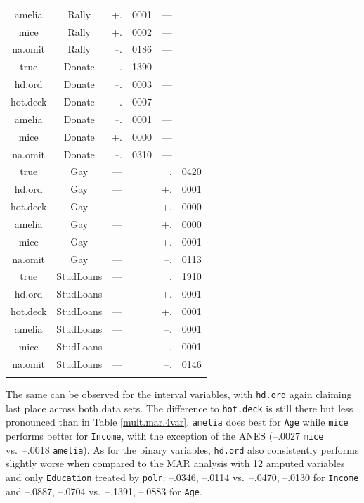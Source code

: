 \documentclass[12pt,econ]{sources/authesis}
\begin{document}
\begin{longtable}{ccr@{}lr@{}l}
 amelia & Rally & +.&0001 & --- \\ 
 mice & Rally & +.&0002 & --- \\
 na.omit & Rally & --.&0186 & --- \\ 
 true & Donate & .&1390 & --- \\ 
 hd.ord & Donate & --.&0003 & --- \\ 
 hot.deck & Donate & --.&0007 & --- \\
 amelia & Donate & --.&0001 & --- \\
 mice & Donate & +.&0000 & --- \\ 
 na.omit & Donate & --.&0310 & --- \\ 
 true & Gay & \multicolumn{2}{l}{---} & .&0420 \\ 
 hd.ord & Gay & \multicolumn{2}{l}{---} & +.&0001 \\ 
 hot.deck & Gay & \multicolumn{2}{l}{---} & +.&0000 \\ 
 amelia & Gay & \multicolumn{2}{l}{---} & +.&0000 \\ 
 mice & Gay & \multicolumn{2}{l}{---} & +.&0001 \\
 na.omit & Gay & \multicolumn{2}{l}{---} & --.&0113 \\ 
 true & StudLoans & \multicolumn{2}{l}{---} & .&1910 \\
 hd.ord & StudLoans & \multicolumn{2}{l}{---} & +.&0001 \\ 
 hot.deck & StudLoans & \multicolumn{2}{l}{---} & +.&0001 \\
 amelia & StudLoans & \multicolumn{2}{l}{---} & --.&0001 \\ 
 mice & StudLoans & \multicolumn{2}{l}{---} & --.&0001 \\ 
 na.omit & StudLoans & \multicolumn{2}{l}{---} & --.&0146 \\
 \hline \\[-1.8ex] 
 \end{longtable}
\dsp

\normalsize

The same can be observed for the interval variables, with \texttt{hd.ord} again claiming last place across both data sets. The difference to \texttt{hot.deck} is still there but less pronounced than in Table \ref{mult.mar.4var}. \texttt{amelia} does best for \texttt{Age} while \texttt{mice} performs better for \texttt{Income}, with the exception of the ANES (--.0027 \texttt{mice} vs.~--.0018 \texttt{amelia}). As for the binary variables, \texttt{hd.ord} also consistently performs slightly worse when compared to the MAR analysis with 12 amputed variables and only \texttt{Education} treated by \texttt{polr}: --.0346, --.0114 vs.~--.0470, --.0130 for \texttt{Income} and --.0887, --.0704 vs.~--.1391, --.0883 for \texttt{Age}.
\end{document}
